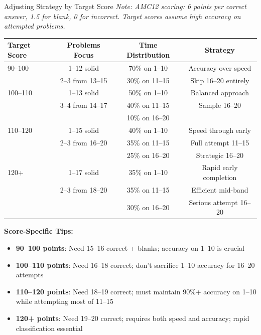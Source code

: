 \documentclass{article}
\begin{document}
\begin{timebox}{Adjusting Strategy by Target Score}
\textit{Note: AMC12 scoring: 6 points per correct answer, 1.5 for blank, 0 for incorrect. Target scores assume high accuracy on attempted problems.}
\begin{center}
\begin{tabular}{|l|c|c|c|}
\hline
\textbf{Target Score} & \textbf{Problems Focus} & \textbf{Time Distribution} & \textbf{Strategy} \\
\hline
90--100 & 1--12 solid & 70\% on 1--10 & Accuracy over speed \\
 & 2--3 from 13--15 & 30\% on 11--15 & Skip 16--20 entirely \\
\hline
100--110 & 1--13 solid & 50\% on 1--10 & Balanced approach \\
 & 3--4 from 14--17 & 40\% on 11--15 & Sample 16--20 \\
 & & 10\% on 16--20 & \\
\hline
110--120 & 1--15 solid & 40\% on 1--10 & Speed through early \\
 & 2--3 from 16--20 & 35\% on 11--15 & Full attempt 11--15 \\
 & & 25\% on 16--20 & Strategic 16--20 \\
\hline
120+ & 1--17 solid & 35\% on 1--10 & Rapid early completion \\
 & 2--3 from 18--20 & 35\% on 11--15 & Efficient mid-band \\
 & & 30\% on 16--20 & Serious attempt 16--20 \\
\hline
\end{tabular}
\end{center}

\textbf{Score-Specific Tips:}
\begin{itemize}[nosep]
\item \textbf{90--100 points}: Need 15--16 correct + blanks; accuracy on 1--10 is crucial
\item \textbf{100--110 points}: Need 16--18 correct; don't sacrifice 1--10 accuracy for 16--20 attempts
\item \textbf{110--120 points}: Need 18--19 correct; must maintain 90\%+ accuracy on 1--10 while attempting most of 11--15
\item \textbf{120+ points}: Need 19--20 correct; requires both speed and accuracy; rapid classification essential
\end{itemize}
\end{timebox}

\newpage
\end{document}
